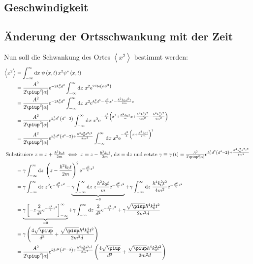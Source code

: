 \subsection{Geschwindigkeit}

\subsection{Änderung der Ortsschwankung mit der Zeit}
Nun soll die Schwankung des Ortes $\left<x^2\right>$ bestimmt werden:
\begin{align*}
	\left<x^2\right>&=\int_{-\infty}^{\infty}\dif x\;\psi\del{x,t}x^2\psi^*\del{x,t}\\
	&=\frac{A^2}{2\piup^2\abs{\alpha}}\ee^{-2k_0^2d^2}\int_{-\infty}^{\infty}\dif x\;x^2\ee^{2\Re\del{\alpha\beta^2}}\\
	&=\frac{A^2}{2\piup^2\abs{\alpha}}\ee^{-2k_0^2d^2}\int_{-\infty}^{\infty}\dif x\;x^2\ee^{k_0^2d^6-\frac{d^2}{4}x^2-\frac{\hbar^2k_0d^2t}{4m}x}\\
	&=\frac{A^2}{2\piup^2\abs{\alpha}}\ee^{k_0^2d^2\del{d^4-2}}\int_{-\infty}^{\infty}\dif x\;x^2
	\ee^{-\frac{d^2}{4}\del{x^2+\frac{\hbar^2k_0t}{m}x+\frac{\hbar^4k_0^2t^2}{4m^2}-\frac{\hbar^4k_0^2t^2}{4m^2}}}\\
	&=\frac{A^2}{2\piup^2\abs{\alpha}}\ee^{k_0^2d^2\del{d^4-2}+\frac{\hbar^4k_0^2d^2t^2}{8m^2}}
	\int_{-\infty}^{\infty}\dif x\;x^2\ee^{-\frac{d^2}{4}\del{x+\frac{\hbar^2k_0t}{2m}}^2}\\
	\intertext{
		Substituiere $z=x+\frac{\hbar^2k_0t}{2m}\iff x=z-\frac{\hbar^2k_0t}{2m}$, $\dif x=\dif z$
		und setzte $\gamma\equiv\gamma\del{t}=\frac{A^2}{2\piup^2\abs{\alpha}}\ee^{k_0^2d^2\del{d^4-2}+\frac{\hbar^4k_0^2d^2t^2}{8m^2}}$
	}
	&=\gamma\int_{-\infty}^{\infty}\dif z\;\del{z-\frac{\hbar^2k_0t}{2m}}^2\ee^{-\frac{d^2}{4}z^2}\\
	&=\gamma\int_{-\infty}^{\infty}\dif z\;z^2\ee^{-\frac{d^2}{4}z^2}-
	\underbrace{\gamma\int_{-\infty}^{\infty}\dif z\;z\frac{\hbar^2k_0t}{m}\ee^{-\frac{d^2}{4}z^2}}_{=0}
	+\gamma\int_{-\infty}^{\infty}\dif z\;\frac{\hbar^4k_0^2t^2}{4m^2}\ee^{-\frac{d^2}{4}z^2}\\
	&=\underbrace{\gamma\left[-z\frac{2}{d^2}\ee^{-\frac{d^2}{4}z^2}\right]_{-\infty}^{\infty}}_{=0}+\gamma\int_{-\infty}^{\infty}\dif z\;
	\frac{2}{d^2}\ee^{-\frac{d^2}{4}z^2}+\gamma\frac{\sqrt{\piup}\hbar^4k_0^2t^2}{2m^2d}\\
	&=\gamma\del{\frac{4\sqrt{\piup}}{d^3}+\frac{\sqrt{\piup}\hbar^4k_0^2t^2}{2m^2d}}\\
	&=\frac{A^2}{2\piup^2\abs{\alpha}}\ee^{k_0^2d^2\del{d^4-2}+\frac{\hbar^4k_0^2d^2t^2}{8m^2}}
	\del{\frac{4\sqrt{\piup}}{d^3}+\frac{\sqrt{\piup}\hbar^4k_0^2t^2}{2m^2d}}\\
\end{align*}

